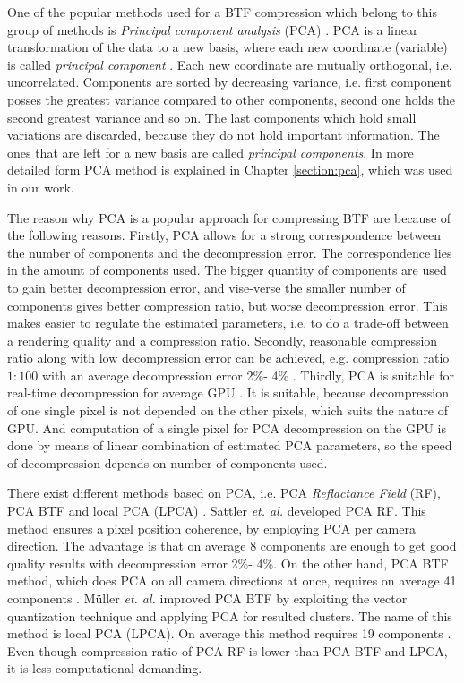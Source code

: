 One of the popular methods used for a BTF compression which belong to this group of methods is \emph{Principal component analysis} (PCA) \cite{Bishop,schneider2004,haindl,webglbtfstreaming,sattler-2003-efficient,mueller-2003-compression,gpu_gems}.
PCA is a linear transformation of the data to a new basis, where each new coordinate (variable) is called \emph{principal component} \cite{Bishop}.
Each new coordinate are mutually orthogonal, i.e. uncorrelated. Components are sorted by decreasing variance, i.e. first component posses the greatest variance compared to other components, 
second one holds the second greatest variance and so on. The last components which hold small variations are discarded, because they do not hold important information.
The ones that are left for a new basis are called \emph{principal components}.
In more detailed form PCA method is explained in Chapter \ref{section:pca}, which was used in our work.

The reason why PCA is a popular approach for compressing BTF are because of the following reasons. 
Firstly, PCA allows for a strong correspondence between the number of components and the decompression error.
 The correspondence lies in the amount of components used.
 The bigger quantity of components are used to gain better decompression error, and vise-verse the smaller number of components gives better compression ratio, but worse decompression error.
 This makes easier to regulate the estimated parameters, i.e. to do a trade-off between a rendering quality and a compression ratio.
Secondly, reasonable compression ratio along with low decompression error can be achieved, e.g. compression ratio $1:100$ with an average decompression error 2\%- 4\% \cite{schneider2004,haindl}.
Thirdly, PCA is suitable for real-time decompression for average GPU \cite{schneider2004,haindl}. 
It is suitable, because decompression of one single pixel is not depended on the other pixels, which suits the nature of GPU.
 And computation of a single pixel for PCA decompression on the GPU is done by means of linear combination of estimated PCA parameters, so the speed of decompression depends on number of components used.
 
 There exist different methods based on PCA, i.e. PCA \emph{Reflactance Field} (RF), PCA BTF and local PCA (LPCA) \cite{sattler-2003-efficient,schneider2004,mueller-2003-compression, haindl}.
 Sattler \emph{et. al.} \cite{sattler-2003-efficient} developed PCA RF. 
 This method ensures a pixel position coherence, by employing PCA per camera direction. 
 The advantage is that on average 8 components are enough to get good quality results with decompression error  2\%- 4\%.
 On the other hand, PCA BTF method, which does PCA on all camera directions at once, requires on average 41 components \cite{haindl}.
 M{\"u}ller  \emph{et. al.} \cite{schneider2004} improved PCA BTF by exploiting the vector quantization technique and applying PCA  for resulted clusters.
 The name of this method is local PCA (LPCA). On average this method requires 19 components \cite{haindl}.
 Even though compression ratio of PCA RF is lower than PCA BTF and LPCA, it is less computational demanding.


